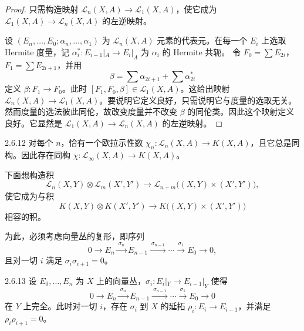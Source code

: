 \begin{proof}
  只需构造映射 $\mathcal{L}_n(X,A)\to\mathcal{L}_1(X,A)$，使它成为 $\mathcal{L}_1(X,A)\to\mathcal{L}_n(X,A)$ 的左逆映射。

  设 $(E_n,\dots,E_0;\alpha_n,\dots,\alpha_1)$ 为 $\mathcal{L}_n(X,A)$ 元素的代表元。在每一个 $E_i$ 上选取 Hermite 度量，记 $\alpha_i^*\colon E_{i-1}|_A\to E_i|_A$ 为 $\alpha_i$ 的 Hermite 共轭。
  令 $F_0=\sum E_{2i}$，$F_1=\sum E_{2i+1}$，并用
  \[
  \beta=\sum\alpha_{2i+1}+\sum\alpha_{2i}^*
  \]
  定义 $\beta\colon F_1\to F_0$。此时 $[F_1,F_0,\beta]\in\mathcal{L}_1(X,A)$。这给出映射 $\mathcal{L}_n(X,A)\to\mathcal{L}_1(X,A)$。要说明它定义良好，只需说明它与度量的选取无关。然而度量的选法彼此同伦，故改变度量并不改变 $\beta$ 的同伦类。因此这个映射定义良好。它显然是 $\mathcal{L}_1(X,A)\to\mathcal{L}_n(X,A)$ 的左逆映射。
\end{proof}

\begin{corollary*}{2.6.12}
  对每个 $n$，恰有一个欧拉示性数 $\chi_n\colon\mathcal{L}_n(X,A)\to K(X,A)$，且它总是同构。因此存在同构 $\chi\colon\mathcal{L}_\infty(X,A)\to K(X,A)$。
\end{corollary*}

下面想构造积
\[
\mathcal{L}_n(X,Y)\otimes\mathcal{L}_m(X',Y')\longrightarrow\mathcal{L}_{n+m}\bigl((X,Y)\times(X',Y')\bigr),
\]
使它成为与积
\[
K(X,Y)\otimes K(X',Y')\longrightarrow K\bigl((X,Y)\times(X',Y')\bigr)
\]
相容的积。

为此，必须考虑向量丛的复形，即序列
\[
0\longrightarrow E_n\xrightarrow{\ \sigma_n\ }E_{n-1}\xrightarrow{\ \sigma_{n-1}\ }\cdots\xrightarrow{\ \sigma_1\ }E_0\longrightarrow 0,
\]
且对一切 $i$ 满足 $\sigma_i\sigma_{i+1}=0$。

\begin{lemma*}{2.6.13}
  设 $E_0,\dots,E_n$ 为 $X$ 上的向量丛，$\sigma_i\colon E_i|_Y\to E_{i-1}|_Y$ 使得
  \[
  0\longrightarrow E_n\xrightarrow{\ \sigma_n\ }E_{n-1}\xrightarrow{\ \sigma_{n-1}\ }\cdots\xrightarrow{\ \sigma_1\ }E_0\longrightarrow 0
  \]
  在 $Y$ 上完全。此时对一切 $i$，存在 $\sigma_i$ 到 $X$ 的延拓 $\rho_i\colon E_i\to E_{i-1}$，并满足 $\rho_i\rho_{i+1}=0$。
\end{lemma*}

